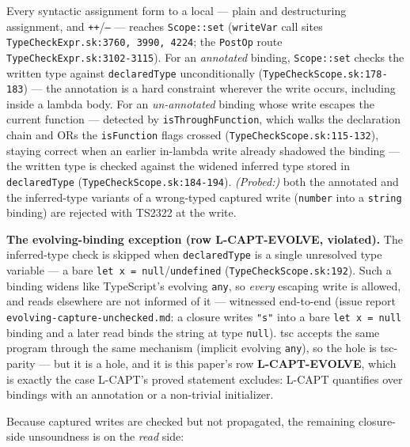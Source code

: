 \documentclass[11pt]{article}
\begin{document}
\begin{lemma}
\label{lem:capt}
Every syntactic assignment form to a local — plain and destructuring
assignment, and \texttt{++}/\texttt{--} — reaches \texttt{Scope::set}
(\texttt{writeVar} call sites \texttt{TypeCheckExpr.sk:3760, 3990, 4224};
the \texttt{PostOp} route \texttt{TypeCheckExpr.sk:3102-3115}). For an
\emph{annotated} binding, \texttt{Scope::set} checks the written type
against \texttt{declaredType} unconditionally
(\texttt{TypeCheckScope.sk:178-183}) — the annotation is a hard
constraint wherever the write occurs, including inside a lambda body.
For an \emph{un-annotated} binding whose write escapes the current
function — detected by \texttt{isThroughFunction}, which walks the
declaration chain and ORs the \texttt{isFunction} flags crossed
(\texttt{TypeCheckScope.sk:115-132}), staying correct when an earlier
in-lambda write already shadowed the binding — the written type is
checked against the widened inferred type stored in
\texttt{declaredType} (\texttt{TypeCheckScope.sk:184-194}).
\emph{(Probed:)} both the annotated and the inferred-type variants of a
wrong-typed captured write (\texttt{number} into a \texttt{string}
binding) are rejected with TS2322 at the write.
\end{lemma}

\begin{keydef}
\textbf{The evolving-binding exception (row L-CAPT-EVOLVE, violated).} The
inferred-type check is
skipped when \texttt{declaredType} is a single unresolved type variable
— a bare \texttt{let x = null}/\texttt{undefined}
(\texttt{TypeCheckScope.sk:192}). Such a binding widens like
TypeScript's evolving \texttt{any}, so \emph{every} escaping write is
allowed, and reads elsewhere are not informed of it — witnessed
end-to-end (issue report \texttt{evolving-capture-unchecked.md}: a
closure writes \texttt{"s"} into a bare \texttt{let x = null} binding
and a later read binds the string at type \texttt{null}). tsc accepts
the same program through the same mechanism (implicit evolving
\texttt{any}), so the hole is tsc-parity — but it is a hole, and it is
this paper's row \textbf{L-CAPT-EVOLVE}, which is exactly the case
L-CAPT's proved statement excludes: L-CAPT quantifies over bindings
with an annotation or a non-trivial initializer.
\end{keydef}

Because captured writes are checked but not propagated, the remaining
closure-side unsoundness is on the \emph{read} side:
\end{document}
